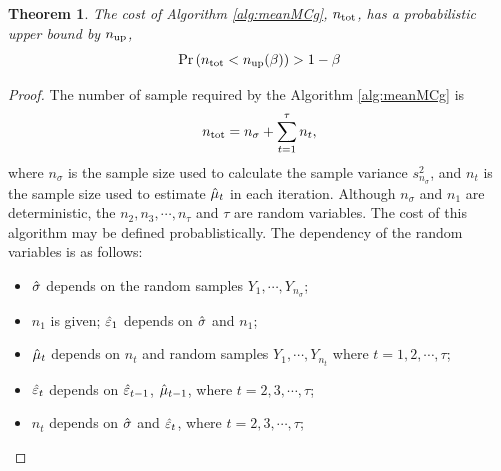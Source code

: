 \documentclass{iitthesis}
\newtheorem{theorem}{Theorem}[section]
\theoremstyle{definition}
\begin{document}
\label{sec:meanmcgcost}

\begin{theorem}\label{cost:meanMCg}
The cost of Algorithm \ref{alg:meanMCg}, $n_{\operatorname{tot}}$, has a probabilistic upper bound by $n_{\operatorname{up}}$, 
\begin{equation}
\Pr \left(n_{\operatorname{tot}}<n_{\operatorname{up}} (\beta)\right) >1-\beta
\end{equation}
\end{theorem}
\begin{proof}
The number of sample required by the Algorithm \ref{alg:meanMCg} is $$n_{\operatorname{tot}} = n_{\sigma}+\sum_{t=1}^\tau n_t,$$ where $n_\sigma$ is the sample size used to calculate the sample variance $s_{n_\sigma}^2$, and $n_t$ is the sample size used to estimate $\hat{\mu}_t$ in each iteration. Although $n_{\sigma}$ and $n_1$ are deterministic, the $n_2, n_3,\cdots, n_\tau$ and $\tau$ are random variables. The cost of this algorithm may be defined probablistically. The dependency of the random variables is as follows:
 \begin{itemize}
 \item $\hat{\sigma}$ depends on the random samples $Y_1,\cdots, Y_{n_\sigma}$;
 \item $n_1$ is given; $\hat{\varepsilon}_1$ depends on $\hat{\sigma}$ and $n_1$; 
 \item $\hat{\mu}_t$ depends on $n_t$ and random samples $Y_1, \cdots, Y_{n_t}$ where $t = 1,2,\cdots,\tau$;
 \item $\hat{\varepsilon}_t$ depends on $\hat{\varepsilon}_{t-1}$, $\hat{\mu}_{t-1}$, where $t= 2,3,\cdots,\tau$;
 \item $n_t$ depends on  $\hat{\sigma}$ and $\hat{\varepsilon}_t$, where  $t = 2,3,\cdots,\tau$;
 \end{itemize}
 

\end{proof}
\end{document}
